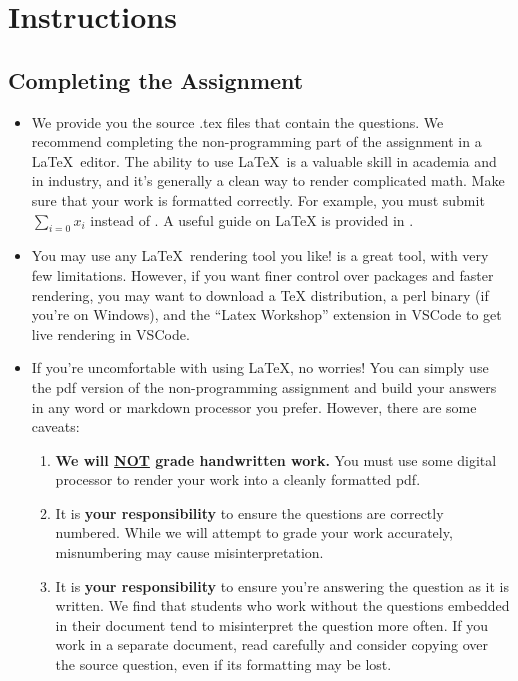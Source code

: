 \section*{Instructions}
\subsection*{Completing the Assignment}
\begin{itemize}
    \item We provide you the source .tex files that contain the questions. We recommend completing the non-programming part of the assignment in a \LaTeX~editor. The ability to use \LaTeX~is a valuable skill in academia and in industry, and it's generally a clean way to render complicated math. Make sure that your work is formatted correctly. For example, you must submit $\sum_{i=0} x_i$ instead of . A useful guide on LaTeX is provided in .
    \item You may use any \LaTeX~rendering tool you like!  is a great tool, with very few limitations. However, if you want finer control over packages and faster rendering, you may want to download a TeX distribution, a perl binary (if you're on Windows), and the ``Latex Workshop'' extension in VSCode to get live rendering in VSCode.
    \item If you're uncomfortable with using \LaTeX, no worries! You can simply use the pdf version of the non-programming assignment and build your answers in any word or markdown processor you prefer. However, there are some caveats:\begin{enumerate}[label = \arabic*.]
        \item \textbf{We will \underline{NOT} grade handwritten work.} You must use some digital processor to render your work into a cleanly formatted pdf.
        \item It is \textbf{your responsibility} to ensure the questions are correctly numbered. While we will attempt to grade your work accurately, misnumbering may cause misinterpretation.
        \item It is \textbf{your responsibility} to ensure you're answering the question as it is written. We find that students who work without the questions embedded in their document tend to misinterpret the question more often. If you work in a separate document, read carefully and consider copying over the source question, even if its formatting may be lost.
    \end{enumerate}
\end{itemize}
